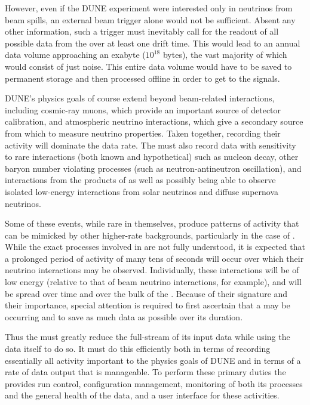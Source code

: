 However, even if the DUNE experiment were interested only in 
neutrinos from %
beam spills, an external beam
trigger alone would not be sufficient. 
Absent any other information, such a trigger must inevitably call for
the readout of all possible data from the  %
over at least one \lartpc drift time.
This would lead to an annual data volume approaching an exabyte
($10^{18}$ bytes), the vast majority of which would consist of just noise. 
This entire data volume would have to be saved to permanent storage
and then processed offline in order to get to the signals.

DUNE's physics goals of course extend beyond beam-related interactions, including
cosmic-ray muons, which provide an important
source of detector calibration, and atmospheric neutrino interactions,
which give a secondary source from which to measure neutrino
properties. 
Taken together, %
recording their activity will
dominate the data rate.
The  must also record data with sensitivity to rare interactions
(both known and hypothetical) such as nucleon decay, other baryon
number violating processes (such as neutron-antineutron oscillation),
and interactions from the products of  as well as possibly
being able to observe isolated low-energy interactions from solar
neutrinos and diffuse supernova neutrinos. 

Some of these events, while rare in themselves, produce patterns of
activity that can be mimicked by other higher-rate backgrounds, particularly
in the case of . %
While the exact processes involved in  are not fully understood,
it is expected that a prolonged period of activity of many tens of
seconds will occur over which their neutrino interactions may be
observed. 
Individually, these interactions will be of low energy (relative to
that of beam neutrino interactions, for example), and will be spread
over time and over the bulk of the . 
Because of their signature and their importance, special attention is
required to first ascertain that a  may be occurring and to save as
much data as possible over its duration.

Thus the  must greatly reduce the full-stream of its input data
while using the data itself to do so. 
It must do this efficiently both in terms of recording essentially all
activity important to the physics goals of DUNE and in terms of a rate of data output 
that is manageable.  
To perform these primary duties the  %
provides run
control, configuration management, monitoring of both its processes
and the general health of the data, and a user interface for these activities.

